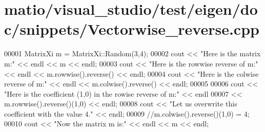 \hypertarget{matio_2visual__studio_2test_2eigen_2doc_2snippets_2_vectorwise__reverse_8cpp_source}{}\section{matio/visual\+\_\+studio/test/eigen/doc/snippets/\+Vectorwise\+\_\+reverse.cpp}
\label{matio_2visual__studio_2test_2eigen_2doc_2snippets_2_vectorwise__reverse_8cpp_source}

\begin{DoxyCode}
00001 MatrixXi m = MatrixXi::Random(3,4);
00002 cout << \textcolor{stringliteral}{"Here is the matrix m:"} << endl << m << endl;
00003 cout << \textcolor{stringliteral}{"Here is the rowwise reverse of m:"} << endl << m.rowwise().reverse() << endl;
00004 cout << \textcolor{stringliteral}{"Here is the colwise reverse of m:"} << endl << m.colwise().reverse() << endl;
00005 
00006 cout << \textcolor{stringliteral}{"Here is the coefficient (1,0) in the rowise reverse of m:"} << endl
00007 << m.rowwise().reverse()(1,0) << endl;
00008 cout << \textcolor{stringliteral}{"Let us overwrite this coefficient with the value 4."} << endl;
00009 \textcolor{comment}{//m.colwise().reverse()(1,0) = 4;}
00010 cout << \textcolor{stringliteral}{"Now the matrix m is:"} << endl << m << endl;
\end{DoxyCode}
